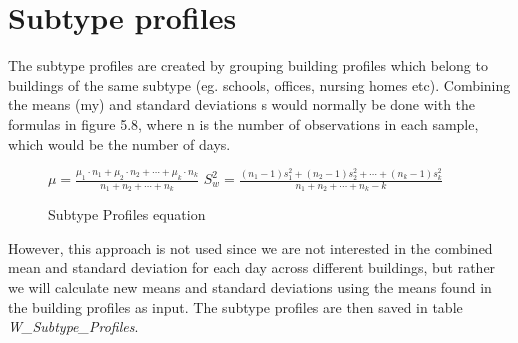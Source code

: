 \section*{Subtype profiles}
The subtype profiles are created by grouping building profiles which belong to buildings of the same subtype (eg. schools, offices, nursing homes etc). Combining the means (my) and standard deviations s would normally be done with the formulas in figure 5.8, where n is the number of observations in each sample, which would be the number of days.
\begin{figure}
\begin{center}
$\mu = \frac{\mu_1\cdot n_1+\mu_2\cdot n_2+ \cdots +\mu_k\cdot n_k}{n_1+n_2+ \cdots +n_k}$
\newline
\newline
$S_w^2 = \frac{(n_1-1)s_1^2+(n_2-1)s_2^2+\cdots +(n_k - 1)s_k^2}{n_1 + n_2+\cdots +n_k -k}$
\end{center}
\caption{Subtype Profiles equation}
\end{figure}

However, this approach is not used since we are not interested in the combined mean and standard deviation for each day across different buildings, but rather we will calculate new means and standard deviations using the means found in the building profiles as input. The subtype profiles are then saved in table \emph{W\_Subtype\_Profiles}.
